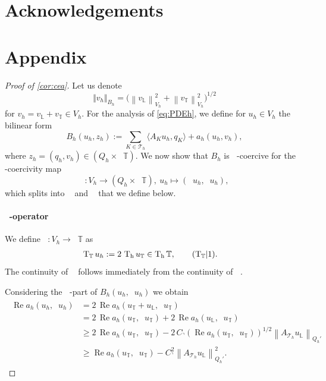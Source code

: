 \documentclass[11pt]{article}
\theoremstyle{definition}
\theoremstyle{plain}
\newcommand{\Bhnorm}[1]{\Vert #1 \Vert_{B_h}}
\newcommand{\CT}{C_\urcorner}
\newcommand{\dgnorm}[1]{\norm{#1}_{V_h}}
\newcommand{\Th}{{\calT_h}}
\newcommand{\AK}{{A_K}}
\newcommand{\Qh}{Q_h}
\newcommand{\ATh}{A_{\Th}}
\newcommand{\Bh}{{B_h}}
\renewcommand{\Re}{\operatorname{Re}}
\DeclareMathOperator{\tcq}{T_\IL}
\DeclareMathOperator{\tct}{T_\IT}
\DeclareMathOperator{\tcb}{T_{B}}
\DeclareMathOperator{\tch}{T_h}
\newcommand*{\norm}[1]{\left\|#1\right\|}
\newcommand{\IL}{\mathbb{L}}
\newcommand{\IT}{\mathbb{T}}
\newcommand{\ITh}{\mathbb{T}}
\newcommand{\calT}{\mathcal{T}}
\begin{document}
\section*{Acknowledgements}




\newpage
\section*{Appendix}

\begin{proof}[Proof of \cref{cor:cea}]
Let us denote
\[
\Bhnorm{v_h} = \bigl(\dgnorm{v_\IL}^2 + \dgnorm{v_\IT}^2\bigr)^{1/2}
\]
for $v_h = v_\IL + v_\IT \in V_h$.
For the analysis of \eqref{eq:PDEh}, we define for $u_h \in V_h$ the bilinear form
\begin{equation}\label{eq:Bh}
    \Bh (u_h, z_h ) := \sum_{K\in \Th} \langle \AK  u_h, q_K \rangle + a_h(u_h,v_h),
\end{equation}
where $z_h = (q_h, v_h) \in (\Qh \times \tch \ITh)$. We now show that $\Bh$ is $\tcb$-coercive
for the $\tcb$-coercivity map 
\[
    \tcb: V_h \to (\Qh \times \tch \ITh),\  u_h \mapsto  (\tcq u_h , \tct u_h ),
\]
which splits into $\tcq$ and $\tct$ that we define below. 

\paragraph{$\tct$-operator} We define $\tct:V_h\rightarrow \tch \ITh$ as
\begin{align}
    \tct u_h &:= 2\,\tch u_{\IT}  \in \tch \ITh,
    \addtocounter{equation}{1} \tag{$\tct\!|$\theequation}.
\end{align}
The continuity of $\tct$ follows immediately from the continuity of $\tch$.

Considering the $\tct$-part of $\Bh(u_h,\tcb u_h)$ we obtain
\begin{align}\label{eq:Bhstab1}
    \begin{split}
    \Re a_h(u_h,\tct u_h)
     &= 2\,\Re a_h(u_\IT + u_\IL, \tch u_\IT ) \\
     &= 2\,\Re a_h(u_\IT, \tch u_\IT) + 2\,\Re a_h(u_\IL, \tch u_\IT)  \\
     &\geq 2\,\Re a_h(u_\IT, \tch u_\IT)
     -2\,\CT (\Re a_h(u_\IT, \tch u_\IT))^{1/2} \norm{\ATh u_\IL}_{\Qh'} 
     \\
     &\geq \Re a_h(u_\IT, \tch u_\IT) - \CT^2 \norm{\ATh u_\IL}_{\Qh'}^2 .
    \end{split}
\end{align}


\end{proof}
\end{document}
